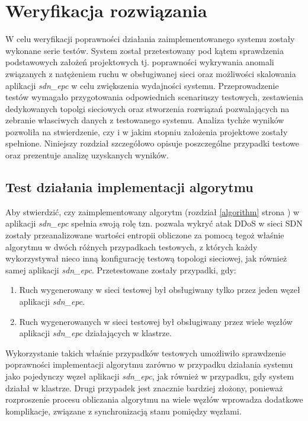 \chapter{Weryfikacja rozwiązania}

W celu weryfikacji poprawności działania zaimplementowanego systemu zostały
wykonane serie testów. System został przetestowany pod kątem sprawdzenia
podstawowych założeń projektowych tj. poprawności wykrywania anomali związanych
z natężeniem ruchu w obsługiwanej sieci oraz możliwości skalowania
aplikacji \textit{sdn\_epc} w celu zwiększenia wydajności systemu.
Przeprowadzenie testów wymagało przygotowania odpowiednich scenariuszy testowych,
zestawienia dedykowanych topolgi sieciowych oraz stworzenia rozwiązań
pozwalających na zebranie własciwych danych z testowanego systemu. Analiza
tychże wyników pozwoliła na stwierdzenie, czy i w jakim stopniu założenia
projektowe zostały spełnione. Niniejszy rozdział szczegółowo opisuje
poszczególne przypadki testowe oraz prezentuje analizę uzyskanych wyników.

\section{Test działania implementacji algorytmu}

Aby stwierdzić, czy zaimplementowany algorytm (rozdział \ref{algorithm} strona
\pageref{algorithm}) w aplikacji \textit{sdn\_epc} spełnia swoją rolę tzn.
pozwala wykryć atak DDoS w sieci SDN zostały przeanalizowane wartości entropii
obliczone za pomocą tegoż właśnie algorytmu w dwóch różnych przypadkach
testowych, z których każdy wykorzystywał nieco inną konfigurację testową
topologi sieciowej, jak również samej aplikacji \textit{sdn\_epc}. Przetestowane
zostały przypadki, gdy:  
\begin{enumerate}
  \item Ruch wygenerowany w sieci testowej był obsługiwany tylko przez jeden
    węzeł aplikacji \textit{sdn\_epc}.
  \item Ruch wygenerowanych w sieci testowej był obsługiwany przez wiele węzłów
    aplikacji \textit{sdn\_epc} działających w klastrze.
\end{enumerate}
Wykorzystanie takich właśnie przypadków testowych umożliwiło sprawdzenie
poprawności implementacji algorytmu zarówno w przypadku działania systemu jako
pojedynczy węzeł aplikacji \textit{sdn\_epc}, jak również w przypadku, gdy
system działał w klastrze. Drugi przypadek jest znacznie bardziej złożony,
ponieważ rozproszenie procesu obliczania algorytmu na wiele węzłów wprowadza
dodatkowe komplikacje, związane z synchronizacją stanu pomiędzy węzłami.

